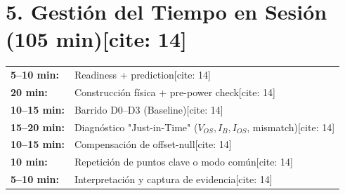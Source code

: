 \documentclass[11pt, a4paper]{article}
\begin{document}
\section*{5. Gestión del Tiempo en Sesión (105 min)[cite: 14]}
\begin{tabularx}{\textwidth}{@{} l X @{}}
    \textbf{5–10 min:} & Readiness + prediction[cite: 14] \\
    \textbf{20 min:} & Construcción física + pre-power check[cite: 14] \\
    \textbf{10–15 min:} & Barrido D0–D3 (Baseline)[cite: 14] \\
    \textbf{15–20 min:} & Diagnóstico "Just-in-Time" ($V_{OS}, I_B, I_{OS}$, mismatch)[cite: 14] \\
    \textbf{10–15 min:} & Compensación de offset-null[cite: 14] \\
    \textbf{10 min:} & Repetición de puntos clave o modo común[cite: 14] \\
    \textbf{5–10 min:} & Interpretación y captura de evidencia[cite: 14]
\end{tabularx}
\end{document}
